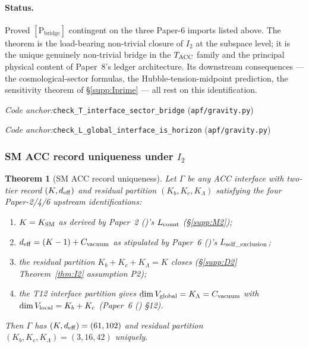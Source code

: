 \documentclass[11pt]{article}
\theoremstyle{plain}
\newtheorem{theorem}{Theorem}[section]
\theoremstyle{definition}
\theoremstyle{remark}
\newcommand{\paperref}[2]{Paper~#1 (\emph{#2})}
\newcommand{\coderef}[2]{\par\noindent\textit{Code anchor:}\quad\texttt{#1} (\texttt{#2})}
\begin{document}
\paragraph{Status.}  Proved $[\text{P}_{\mathrm{bridge}}]$ contingent on the three Paper-6 imports listed above.  The theorem is the load-bearing non-trivial closure of $I_2$ at the subspace level; it is the unique genuinely non-trivial bridge in the $T_{\rm ACC}$ family and the principal physical content of Paper~8's ledger architecture.  Its downstream consequences --- the cosmological-sector formulas, the Hubble-tension-midpoint prediction, the sensitivity theorem of \S\ref{supp:Iprime} --- all rest on this identification.

\coderef{check\_T\_interface\_sector\_bridge}{apf/gravity.py}
\coderef{check\_L\_global\_interface\_is\_horizon}{apf/gravity.py}

\bigskip

\subsubsection*{SM ACC record uniqueness under $I_2$}

\begin{theorem}[SM ACC record uniqueness]\label{thm:I2_uniqueness_SM}
Let $\Gamma$ be any ACC interface with two-tier record $(K, d_{\rm eff})$ and residual partition $(K_b, K_c, K_\Lambda)$ satisfying the four Paper-2/4/6 upstream identifications:
\begin{enumerate}[leftmargin=2.5em,label=\textup{(U\arabic*)},itemsep=3pt]
  \item $K = K_{\rm SM}$ as derived by \paperref{2}{}'s $L_{\rm count}$ (\S\ref{supp:M2});
  \item $d_{\rm eff} = (K - 1) + C_{\rm vacuum}$ as stipulated by \paperref{6}{}'s $L_{\rm self\_exclusion}$;
  \item the residual partition $K_b + K_c + K_\Lambda = K$ closes (\S\ref{supp:D2} Theorem~\ref{thm:I2} assumption P2);
  \item the T12 interface partition gives $\dim V_{\rm global} = K_\Lambda = C_{\rm vacuum}$ with $\dim V_{\rm local} = K_b + K_c$ (\paperref{6}{} \S12).
\end{enumerate}
Then $\Gamma$ has $(K, d_{\rm eff}) = (61, 102)$ and residual partition $(K_b, K_c, K_\Lambda) = (3, 16, 42)$ uniquely.
\end{theorem}
\end{document}
